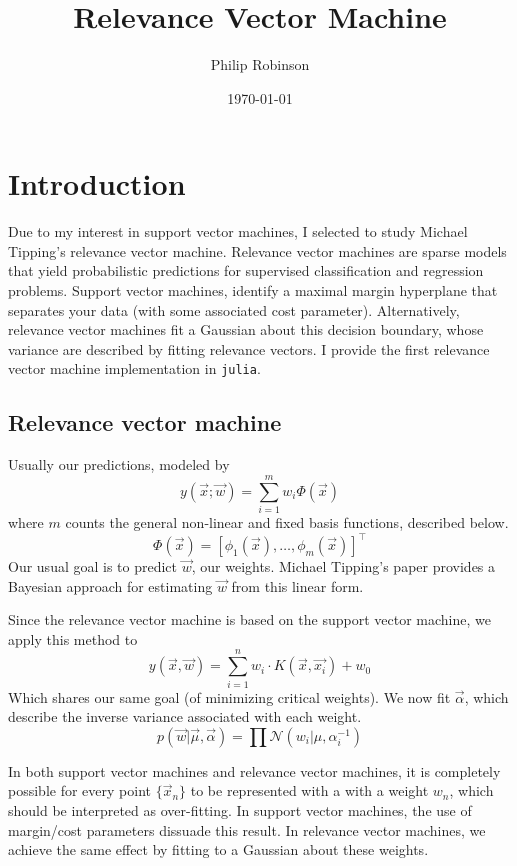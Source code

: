 \documentclass[11pt]{article} %
\title{Relevance Vector Machine}
\date{\today}
\author{Philip Robinson}
\affil{Oregon Health Sciences University}
\def\rv{relevance vector\xspace}
\def\RVM{Relevance vector machine\xspace}
\def\rvm{\rv machine\xspace}
\def\SVM{Support vector machine\xspace}
\def\svm{support vector machine\xspace}
\def\julia{\texttt{julia}\xspace}
\def\MT{Michael Tipping\xspace}
\begin{document}
\maketitle


\section{Introduction}
Due to my interest in \svm{}s, I selected to study \MT's \rvm.
\RVM{}s are sparse models that yield probabilistic predictions
for supervised classification and regression problems. \SVM{}s,
identify a maximal margin hyperplane that separates your data
(with some associated cost parameter). Alternatively, \rvm{}s
fit a Gaussian about this decision boundary, whose variance
are described by fitting \rv{}s. I provide the first \rvm
implementation in \julia.

\subsection{\RVM}
Usually our predictions, modeled by
\[y(\vec{x}; \vec{w}) = \sum_{i=1}^m w_i \Phi(\vec{x})\]
where $m$ counts the general non-linear and fixed basis
functions, described below.
\[\Phi(\vec{x}) = \left[\phi_1(\vec{x}), \dots, \phi_m(\vec{x})\right]^\intercal\]
Our usual goal is to predict $\vec{w}$, our weights.
\MT's paper provides a Bayesian approach for estimating
$\vec{w}$ from this linear form.

Since the \rvm is based on the \svm, we apply this method to
\[y(\vec{x},\vec{w})=\sum_{i=1}^n w_i\cdot K(\vec{x}, \vec{x_i}) + w_0\]
Which shares our same goal (of minimizing critical weights).
We now fit $\vec{\alpha}$, which describe the inverse variance
associated with each weight.
\[p(\vec{w}|\vec{\mu},\vec{\alpha}) = \prod\mathcal{N}(w_i |\mu,\alpha_i^{-1})\]

In both \svm{}s and \rvm{}s, it is completely possible for
every point \(\{\vec{x}_n\}\) to be represented with a with a
weight $w_n$, which should be interpreted as over-fitting. In
\svm{}s, the use of margin/cost parameters dissuade this result.
In \rvm{}s, we achieve the same effect by fitting to a Gaussian
about these weights.
\end{document}
